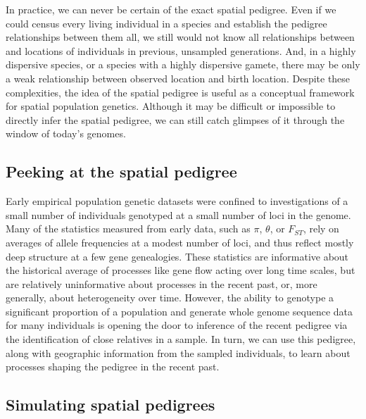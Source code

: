 \documentclass{ar-1col}
\begin{document}
In practice, we can never be certain of the exact spatial pedigree.
Even if we could census every living individual in a species
and establish the pedigree relationships between them all,
we still would not know all relationships between
and locations of individuals in previous, unsampled generations.
And, in a highly dispersive species,
or a species with a highly dispersive gamete,
there may be only a weak relationship between observed location and birth location.
Despite these complexities,
the idea of the spatial pedigree is useful
as a conceptual framework for spatial population genetics.
Although it may be difficult or impossible
to directly infer the spatial pedigree,
we can still catch glimpses of it through the window of today's genomes.

\subsection{Peeking at the spatial pedigree}
Early empirical population genetic datasets were confined to 
investigations of a small number of individuals 
genotyped at a small number of loci in the genome.
Many of the statistics measured from early data, 
such as $\pi$, $\theta$, or $F_{ST}$,
rely on averages of allele frequencies
at a modest number of loci,
and thus reflect mostly deep structure at a few gene genealogies.
These statistics are informative about 
the historical average of processes like gene flow acting over long time scales, 
but are relatively uninformative about processes in the recent past, 
or, more generally, about heterogeneity over time.
However, the ability to genotype a significant proportion of a population 
and generate whole genome sequence data for many individuals 
is opening the door to inference of the recent pedigree 
via the identification of close relatives in a sample.
In turn, we can use this pedigree, 
along with geographic information from the sampled individuals, 
to learn about processes shaping the pedigree in the recent past.

\subsection{Simulating spatial pedigrees}
\end{document}
